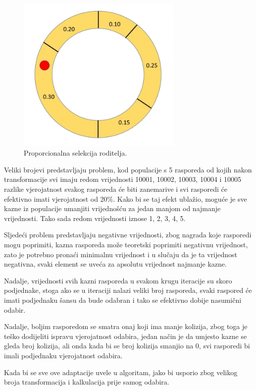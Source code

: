 \documentclass[times, utf8, zavrsni]{fer}
\begin{document}
\begin{figure}[htb]
\centering
\includegraphics[width=8cm]{images/rulet.png}
\caption{Proporcionalna selekcija roditelja.}
\label{fig:rulet}
\end{figure}

Veliki brojevi predstavljaju problem, kod populacije s 5 rasporeda od kojih nakon transformacije svi imaju redom vrijednosti 10001, 10002, 10003, 10004 i 10005 razlike vjerojatnost svakog rasporeda će biti zanemarive i svi rasporedi će efektivno imati vjerojatnost od 20\%. Kako bi se taj efekt ublažio, moguće je sve kazne iz populacije umanjiti vrijednošću za jedan manjom od najmanje vrijednosti. Tako sada redom vrijednosti iznose 1, 2, 3, 4, 5.

Sljedeći problem predstavljaju negativne vrijednosti, zbog nagrada koje rasporedi mogu poprimiti, kazna rasporeda može teoretski poprimiti negativnu vrijednost, zato je potrebno pronaći minimalnu vrijednost i u slučaju da je ta vrijednost negativna, svaki element se uveća za apsolutu vrijednost najmanje kazne.

Nadalje, vrijednosti svih kazni rasporeda u svakom krugu iteracije su skoro podjednake, stoga ako se u iteraciji nalazi veliki broj rasporeda, svaki raspored će imati podjednaku šansu da bude odabran i tako se efektivno dobije nasumični odabir.

Nadalje, boljim rasporedom se smatra onaj koji ima manje kolizija, zbog toga je teško dodijeliti ispravu vjerojatnost odabira, jedan način je da umjesto kazne se gleda broj kolizija, ali onda kada bi se broj kolizija smanjio na 0, svi rasporedi bi imali podjednaku vjerojatnost odabira.

Kada bi se sve ove adaptacije uvele u algoritam, jako bi usporio zbog velikog broja transformacija i kalkulacija prije samog odabira.
\end{document}
